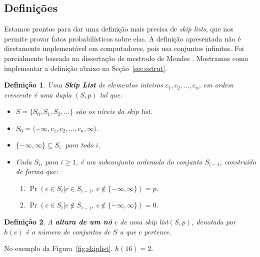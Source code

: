\documentclass[paper=a4, fontsize=11pt]{scrartcl} %
\newtheorem{definition}{Definição}
\numberwithin{equation}{section}
\numberwithin{figure}{section}
\numberwithin{table}{section}
\numberwithin{definition}{section}
\numberwithin{theorem}{section}
\numberwithin{property}{section}
\numberwithin{proposition}{section}
\newcommand{\sls}{\textit{skip lists}\xspace}
\renewcommand{\sl}{\textit{skip list}\xspace}
\begin{document}
\FloatBarrier
\subsection{Definições}

Estamos prontos para dar uma definição mais precisa de \sls , que nos permite provar fatos probabilísticos sobre
elas.
A definição apresentada não é diretamente implementável em computadores, pois usa conjuntos infinitos. Foi
parcialmente baseada na dissertação de mestrado de Mendes \cite{mendes2008estruturas}.
Mostramos
como implementar a definição abaixo na Seção~\ref{sec:estrut}.


\begin{definition}
Uma \textbf{\emph{Skip List}} de elementos inteiros $c_1, c_2, \ldots, c_n$, em ordem crescente é uma dupla $\left( S, p \right)$ tal que:

\begin{itemize}

\item $S = \{S_0, S_1, S_2, \ldots \}$ são os níveis da \sl.

\item $S_0 = \langle -\infty, c_1, c_2, \ldots, c_n, \infty \rangle.$

\item $\{-\infty, \infty\} \subseteq S_i \ $ para todo $i$.

\item Cada $S_i$, para $i \geq 1$, é um subconjunto ordenado do conjunto $S_{i-1}$, construído de forma que:
  \begin{enumerate}[noitemsep]
    \item $\Pr(c \in S_i | c \in S_{i-1} ,\  c \notin \{-\infty, \infty\}) = p$.
    \item  $\Pr(c \in S_i | c \notin S_{i-1}, \ c \notin \{-\infty, \infty\}) = 0$.
  \end{enumerate}

\end{itemize}

\end{definition}


\begin{definition}

A \textbf{altura de um nó} $c$ de uma \sl $( S, p )$, denotada por $h(c)$ é o número de conjuntos de $S$ a que $c$ pertence.

\end{definition}

No exemplo da Figura~\ref{fig:skiplist}, $h(16) = 2$.
\end{document}
